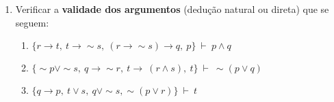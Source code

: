 \documentclass[12pt, a4paper,final]{article}
\begin{document}
\begin{enumerate}

\itemsep 1cm

\item Verificar a \textbf{validade dos argumentos} (dedu\c c\~ao natural ou direta) que se seguem:

\begin{enumerate}


\item $\{r  \rightarrow t,~ t \rightarrow \sim s, ~ (r \rightarrow \sim s) \rightarrow q, ~ p  \} ~\vdash~ p \wedge q $



\item $\{\sim p  \vee \sim s,~ q \rightarrow \sim r, ~ t \rightarrow ~ (r \wedge s) , ~ t  \} ~\vdash~ \sim (p \vee q) $



\item $\{q \rightarrow p, ~ t \vee s, ~ q \vee \sim s, \sim(p \vee r)  \} ~\vdash~ t $














\end{enumerate}
\end{enumerate}
\end{document}
